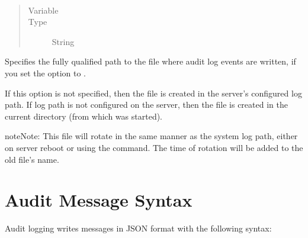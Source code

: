\documentclass[letterpaper,10pt,english]{sphinxmanual}
\begin{document}
\begin{fulllineitems}
\label{\detokenize{audit-logging:cmdoption-auditPath}}~\begin{quote}\begin{description}
\item[{Variable}] \leavevmode
\sphinxAtStartPar
{}

\item[{Type}] \leavevmode
\sphinxAtStartPar
String

\end{description}\end{quote}

\sphinxAtStartPar
Specifies the fully qualified path to the file
where audit log events are written,
if you set the {\hyperref[\detokenize{audit-logging:cmdoption-auditDestination}]{}} option to .

\sphinxAtStartPar
If this option is not specified,
then the  file is created
in the server’s configured log path.
If log path is not configured on the server,
then the  file is created in the current directory
(from which  was started).

\begin{sphinxadmonition}{note}{Note:}
\sphinxAtStartPar
This file will rotate in the same manner as the system log path,
either on server reboot or using the  command.
The time of rotation will be added to the old file’s name.
\end{sphinxadmonition}

\end{fulllineitems}



\section{Audit Message Syntax}
\label{\detokenize{audit-logging:audit-message-syntax}}
\sphinxAtStartPar
Audit logging writes messages in JSON format with the following syntax:
\end{document}
